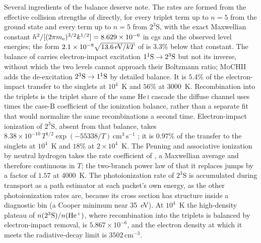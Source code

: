 \documentclass[twocolumn,linenumbers]{aastex702}
\newcommand{\MoCHII}{\textsc{MoCHII}}
\newcommand{\HeI}{He\,\textsc{i}}
\newcommand{\cmc}{\mathrm{cm^{3}\,s^{-1}}}
\begin{document}
Several ingredients of the balance deserve note.  The rates are formed from
the effective collision strengths of \citet[][Tables~2 and 3]{bray2000}
directly, for every triplet term up to $n = 5$ from the ground state and
every term up to $n = 5$ from $2^3$S, with the exact Maxwellian constant
$h^2/[(2\pi m_{\rm e})^{3/2}k^{1/2}] = 8.629\times10^{-6}$ in cgs and the
observed level energies; the form $2.1\times10^{-8}\sqrt{13.6\,{\rm
eV}/kT}$ of \citet{oklopcic2018} is $3.3\%$ below that constant.  The
balance of \citet{oklopcic2018} carries electron-impact excitation
$1^1{\rm S}\to2^3{\rm S}$ but not its inverse, without which the two
levels cannot approach their Boltzmann ratio; \MoCHII{} adds the
de-excitation $2^3{\rm S}\to1^1{\rm S}$ by detailed balance.  It is
$5.4\%$ of the electron-impact transfer to the singlets at $10^4$~K and
$56\%$ at 3000~K.  Recombination into the triplets is the triplet share of
the same \HeI{} cascade the diffuse channel uses times the case-B
coefficient of the ionization balance, rather than a separate fit that
would normalize the same recombinations a second time.  Electron-impact
ionization of $2^3$S, absent from that balance, takes
$8.38\times10^{-10}\,T^{1/2}\exp(-55338/T)\,\cmc$
\citep[][Eq.~12]{black1981}; it is $0.97\%$ of the transfer to the
singlets at $10^4$~K and $18\%$ at $2\times10^4$~K.  The Penning and associative
ionization by neutral hydrogen takes the rate coefficient of
\citet[][Fig.~5]{garciamunoz2025}, a Maxwellian average and therefore
continuous in $T$; the two-branch power law of \citet{taylor2025} that it
replaces jumps by a factor of $1.57$ at 4000~K.  The photoionization rate
of $2^3$S is accumulated during transport as a path estimator at each
packet's own energy, as the other photoionization rates are, because its
cross section has structure inside a diagnostic bin (a Cooper minimum near
35~eV).  At $10^4$~K the high-density plateau of
$n(2^3{\rm S})/n(\mathrm{He^{+}})$, where recombination into the triplets is
balanced by electron-impact removal, is $5.867\times10^{-6}$, and the
electron density at which it meets the radiative-decay limit is
$3502\,\mathrm{cm^{-3}}$.
\end{document}
